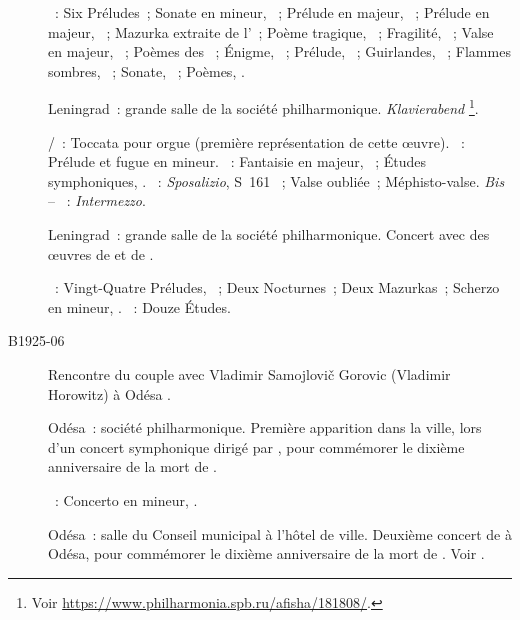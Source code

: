 \begin{description}
 \textsc{\Scriabine{}}~: Six Préludes~; Sonate en \kG \Sharp mineur,
 ~; Prélude en \kB \Flat majeur,  ~; Prélude en
 \kF \Sharp majeur,  ~; Mazurka extraite de l'~;
 Poème tragique, ~; Fragilité,  ~; Valse en \kA
 \Flat majeur, ~; Poèmes des ~; Énigme,
  ~; Prélude,  ~; Guirlandes,
  ~; Flammes sombres,  ~; Sonate,
 ~; Poèmes, .
 \item[\DateWithWeekDay{1925-05-14}]
 Leningrad~: grande salle de la société philharmonique.
 \foreignlanguage{german}{\emph{Klavierabend}}%
 \footnote{Voir \href{https://www.philharmonia.spb.ru/afisha/181808/}%
 {https://www.philharmonia.spb.ru/afisha/181808/}.}.

 \textsc{\Pachelbel{}/\Nikolaiev{}}~: Toccata pour orgue (première
 représentation de cette œuvre).
 \textsc{\JBach{}}~: Prélude et fugue en \kB \Flat mineur.
 \textsc{\Schumann{}}~: Fantaisie en \kC majeur, ~; Études
 symphoniques, .
 \textsc{\Liszt{}}~: \emph{Sposalizio}, S~161 ~; Valse oubliée~;
 Méphisto-valse.
 \emph{Bis} -- \textsc{\Schumann{}}~: \emph{Intermezzo}.
 \item[\DateWithWeekDay{1925-05-23}]
 Leningrad~: grande salle de la société philharmonique.
 Concert avec des œuvres de \Chopin{} et de \Scriabine{}.

 \textsc{\Chopin{}}~: Vingt-Quatre Préludes, ~; Deux Nocturnes~;
 Deux Mazurkas~; Scherzo  en \kC \Sharp mineur, .
 \textsc{\Scriabine{}}~: Douze Études.
 \item[B1925-06]
 Rencontre du couple \Sofronitsky{} avec Vladimir Samojlovič Gorovic
 (Vladimir Horowitz) à Odésa \citep[voir][p.~56]{Juban}.
 \item[\DateWithWeekDay{1925-06-12}]
 Odésa~: société philharmonique.
 Première apparition dans la ville, lors d'un concert symphonique dirigé par
 \VBerdiaiev{}, pour commémorer le dixième anniversaire de la mort de
 \Scriabine{} \citep[voir][p.~152-153]{Nekrasova08}.

 \textsc{\Scriabine{}}~: Concerto en \kF \Sharp mineur, .
 \item[\DateWithWeekDay{1925-06-16}]
 Odésa~: salle du Conseil municipal à l'hôtel de ville.
 Deuxième concert de \VSofronitsky{} à Odésa, pour commémorer le dixième
 anniversaire de la mort de \Scriabine{}.
 Voir \citet[p.~424]{Milshteyn82a}.


\end{description}
